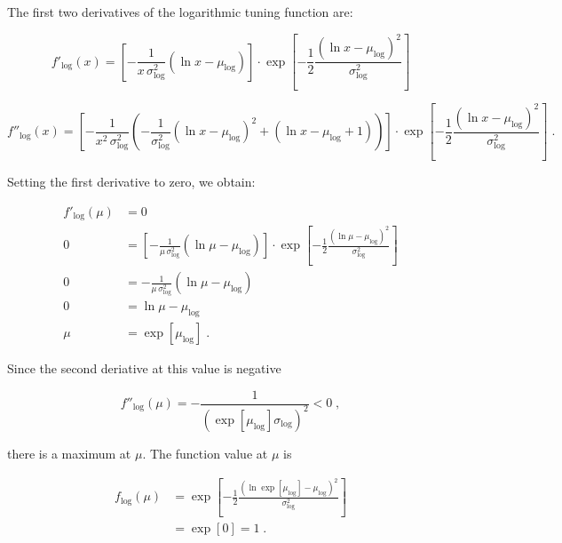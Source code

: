 \documentclass[a4paper,12pt]{article}
\begin{document}
The first two derivatives of the logarithmic tuning function are:

\begin{equation} \label{eq:df-log}
f'_\mathrm{log}(x) = \left[ -\frac{1}{x \, \sigma_\mathrm{log}^2} (\ln x - \mu_\mathrm{log}) \right] \cdot \exp \left[ -\frac{1}{2} \frac{(\ln x - \mu_\mathrm{log})^2}{\sigma_\mathrm{log}^2} \right]
\end{equation}

\begin{equation} \label{eq:d2f-log}
f''_\mathrm{log}(x) = \left[ -\frac{1}{x^2 \, \sigma_\mathrm{log}^2} \left( -\frac{1}{\sigma_\mathrm{log}^2} (\ln x - \mu_\mathrm{log})^2 + (\ln x - \mu_\mathrm{log} +1) \right) \right] \cdot \exp \left[ -\frac{1}{2} \frac{(\ln x - \mu_\mathrm{log})^2}{\sigma_\mathrm{log}^2} \right] \; .
\end{equation}

Setting the first derivative to zero, we obtain:

\vspace{-0.5em}
\begin{equation} \label{eq:mu-qed}
\begin{split}
f'_\mathrm{log}(\mu) &= 0 \\
0 &= \left[ -\frac{1}{\mu \, \sigma_\mathrm{log}^2} (\ln \mu - \mu_\mathrm{log}) \right] \cdot \exp \left[ -\frac{1}{2} \frac{(\ln \mu - \mu_\mathrm{log})^2}{\sigma_\mathrm{log}^2} \right] \\
0 &= -\frac{1}{\mu \, \sigma_\mathrm{log}^2} (\ln \mu - \mu_\mathrm{log}) \\
0 &= \ln \mu - \mu_\mathrm{log} \\
\mu &= \exp \left[ \mu_\mathrm{log} \right] \; .
\end{split}
\end{equation}

Since the second deriative at this value is negative

\begin{equation} \label{eq:d2f-log-mu}
f''_\mathrm{log}(\mu) = -\frac{1}{\left( \exp \left[ \mu_\mathrm{log} \right] \sigma_\mathrm{log} \right)^2} < 0 \; ,
\end{equation}

there is a maximum at $\mu$. The function value at $\mu$ is

\begin{equation} \label{eq:f-log-mu}
\begin{split}
f_\mathrm{log}(\mu) &= \exp \left[ -\frac{1}{2} \frac{(\ln \exp \left[ \mu_\mathrm{log} \right] - \mu_\mathrm{log})^2}{\sigma_\mathrm{log}^2} \right] \\
&= \exp \left[ 0 \right] = 1 \; .
\end{split}
\end{equation}
\end{document}
